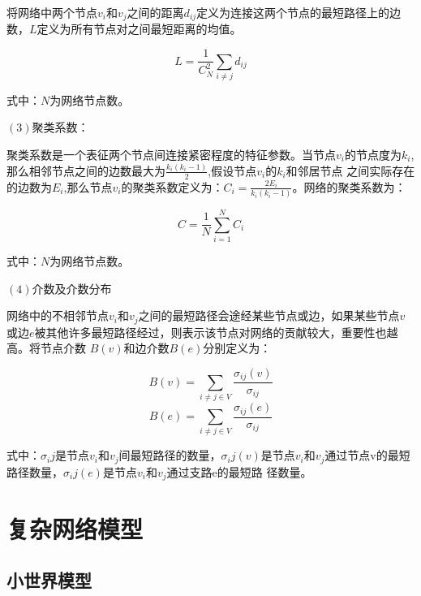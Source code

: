 将网络中两个节点$v_i$和$v_j$之间的距离$d_{ij}$定义为连接这两个节点的最短路径上的边数，$L$定义为所有节点对之间最短距离的均值。

\begin{equation}
    \label{equ:chap3:feature}
    L=\frac{1}{C_N^2} \sum_{i \neq j} d_{i j}
\end{equation}

式中：$N$为网络节点数。

$(3)$聚类系数：

聚类系数是一个表征两个节点间连接紧密程度的特征参数。当节点$v_i$的节点度为$k_i$,那么相邻节点之间的边数最大为$\frac{k_i(k_i-1)}{2}$,假设节点$v_i$的$k_i$和邻居节点
之间实际存在的边数为$E_i$,那么节点$v_i$的聚类系数定义为：$C_i=\frac{2E_i}{k_i(k_i-1)}$。网络的聚类系数为：

\begin{equation} 
    \label{equ:chap3:feature}
    C=\frac{1}{N} \sum_{i=1}^N C_i
\end{equation}

式中：$N$为网络节点数。

$(4)$介数及介数分布

网络中的不相邻节点$v_i$和$v_j$之间的最短路径会途经某些节点或边，如果某些节点$v$或边$e$被其他许多最短路径经过，则表示该节点对网络的贡献较大，重要性也越高。将节点介数
$B(v)$和边介数$B(e)$分别定义为：

\begin{equation} 
    \label{equ:chap3:feature}
    B(v)=\sum_{i \neq j\in V} \frac{\sigma_{ij}(v)}{\sigma_{ij}} 
\end{equation}
\begin{equation} 
    \label{equ:chap3:feature}
    B(e)=\sum_{i \neq j\in V} \frac{\sigma_{ij}(e)}{\sigma_{ij}} 
\end{equation}

式中：$\sigma_ij$是节点$v_i$和$v_j$间最短路径的数量，$\sigma_ij(v)$是节点$v_i$和$v_j$通过节点v的最短路径数量，$\sigma_ij(e)$是节点$v_i$和$v_j$通过支路e的最短路
径数量。



\section{复杂网络模型}
\label{sec:wind}


\subsection{小世界模型}
\label{sec:windEffects}



